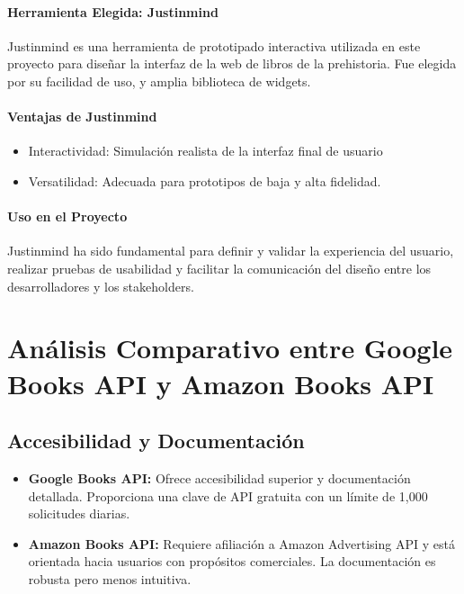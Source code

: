 \paragraph{Herramienta Elegida: Justinmind}

Justinmind es una herramienta de prototipado interactiva utilizada en este proyecto para diseñar la interfaz de la web de libros de la prehistoria. Fue elegida por su facilidad de uso, y amplia biblioteca de widgets.

\paragraph{Ventajas de Justinmind}

\begin{itemize}
    \item Interactividad: Simulación realista de la interfaz final de usuario
    \item Versatilidad: Adecuada para prototipos de baja y alta fidelidad.
\end{itemize}

\paragraph{Uso en el Proyecto}

Justinmind ha sido fundamental para definir y validar la experiencia del usuario, realizar pruebas de usabilidad y facilitar la comunicación del diseño entre los desarrolladores y los stakeholders.

 



\section{Análisis Comparativo entre Google Books API y Amazon Books API}

\subsection{Accesibilidad y Documentación}
\begin{itemize}
    \item \textbf{Google Books API:} Ofrece accesibilidad superior y documentación detallada. Proporciona una clave de API gratuita con un límite de 1,000 solicitudes diarias.
    \item \textbf{Amazon Books API:} Requiere afiliación a Amazon Advertising API y está orientada hacia usuarios con propósitos comerciales. La documentación es robusta pero menos intuitiva.
\end{itemize}

